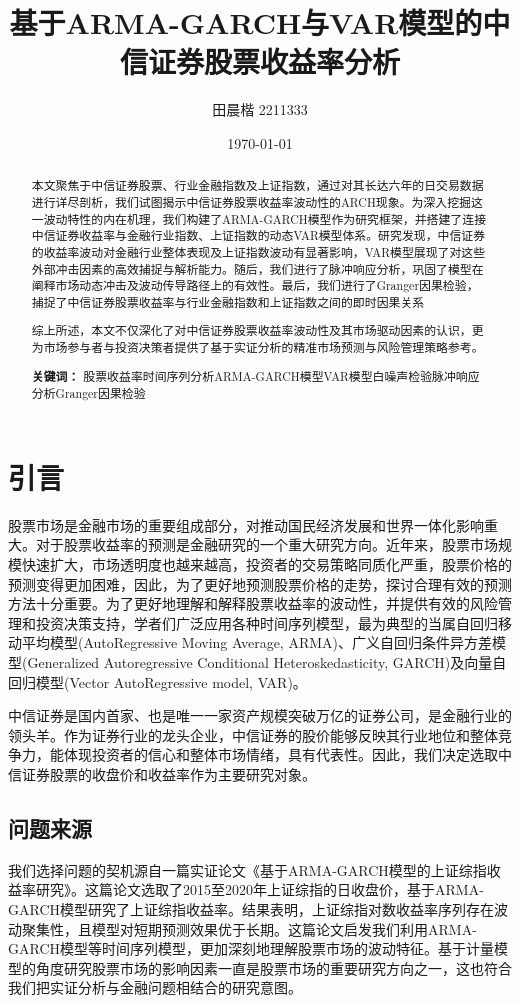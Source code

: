 \documentclass[12pt]{article}
\title{\fontsize{16pt}{16pt}\selectfont 基于ARMA-GARCH与VAR模型的中信证券股票收益率分析}
\author{田晨楷 2211333}
\date{\today}
\newcommand{\keywords}[1]{\textbf{关键词：} #1}
\begin{document}
\maketitle

\begin{abstract}
本文聚焦于中信证券股票、行业金融指数及上证指数，通过对其长达六年的日交易数据进行详尽剖析，我们试图揭示中信证券股票收益率波动性的ARCH现象。为深入挖掘这一波动特性的内在机理，我们构建了ARMA-GARCH模型作为研究框架，并搭建了连接中信证券收益率与金融行业指数、上证指数的动态VAR模型体系。研究发现，中信证券的收益率波动对金融行业整体表现及上证指数波动有显著影响，VAR模型展现了对这些外部冲击因素的高效捕捉与解析能力。随后，我们进行了脉冲响应分析，巩固了模型在阐释市场动态冲击及波动传导路径上的有效性。最后，我们进行了Granger因果检验，捕捉了中信证券股票收益率与行业金融指数和上证指数之间的即时因果关系

综上所述，本文不仅深化了对中信证券股票收益率波动性及其市场驱动因素的认识，更为市场参与者与投资决策者提供了基于实证分析的精准市场预测与风险管理策略参考。

\keywords{股票收益率\quad 时间序列分析\quad ARMA-GARCH模型\quad VAR模型\quad 白噪声检验\quad 脉冲响应分析\quad Granger因果检验}

\end{abstract}

\newpage
\tableofcontents

\newpage
\section{引言}
股票市场是金融市场的重要组成部分，对推动国民经济发展和世界一体化影响重大。对于股票收益率的预测是金融研究的一个重大研究方向。近年来，股票市场规模快速扩大，市场透明度也越来越高，投资者的交易策略同质化严重，股票价格的预测变得更加困难，因此，为了更好地预测股票价格的走势，探讨合理有效的预测方法十分重要。为了更好地理解和解释股票收益率的波动性，并提供有效的风险管理和投资决策支持，学者们广泛应用各种时间序列模型，最为典型的当属自回归移动平均模型(AutoRegressive Moving Average, ARMA)、广义自回归条件异方差模型(Generalized Autoregressive Conditional Heteroskedasticity, GARCH)及向量自回归模型(Vector AutoRegressive model, VAR)。

中信证券是国内首家、也是唯一一家资产规模突破万亿的证券公司，是金融行业的领头羊。作为证券行业的龙头企业，中信证券的股价能够反映其行业地位和整体竞争力，能体现投资者的信心和整体市场情绪，具有代表性。因此，我们决定选取中信证券股票的收盘价和收益率作为主要研究对象。

\subsection{问题来源}
我们选择问题的契机源自一篇实证论文《基于ARMA-GARCH模型的上证综指收益率研究》。这篇论文选取了2015至2020年上证综指的日收盘价，基于ARMA-GARCH模型研究了上证综指收益率。结果表明，上证综指对数收益率序列存在波动聚集性，且模型对短期预测效果优于长期。这篇论文启发我们利用ARMA-GARCH模型等时间序列模型，更加深刻地理解股票市场的波动特征。基于计量模型的角度研究股票市场的影响因素一直是股票市场的重要研究方向之一，这也符合我们把实证分析与金融问题相结合的研究意图。
\end{document}
